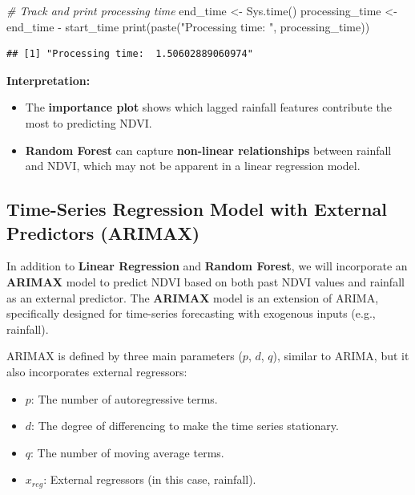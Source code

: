 \documentclass[
]{article}
\newenvironment{Shaded}{}{}
\newcommand{\CommentTok}[1]{\textcolor[rgb]{0.38,0.63,0.69}{\textit{#1}}}
\newcommand{\FunctionTok}[1]{\textcolor[rgb]{0.02,0.16,0.49}{#1}}
\newcommand{\NormalTok}[1]{#1}
\newcommand{\OtherTok}[1]{\textcolor[rgb]{0.00,0.44,0.13}{#1}}
\newcommand{\SpecialCharTok}[1]{\textcolor[rgb]{0.25,0.44,0.63}{#1}}
\newcommand{\StringTok}[1]{\textcolor[rgb]{0.25,0.44,0.63}{#1}}
\providecommand{\tightlist}{%
  \setlength{\itemsep}{0pt}\setlength{\parskip}{0pt}}
\begin{document}
\begin{Shaded}
\begin{Highlighting}[]
\CommentTok{\# Track and print processing time}
\NormalTok{end\_time }\OtherTok{\textless{}{-}} \FunctionTok{Sys.time}\NormalTok{()}
\NormalTok{processing\_time }\OtherTok{\textless{}{-}}\NormalTok{ end\_time }\SpecialCharTok{{-}}\NormalTok{ start\_time}
\FunctionTok{print}\NormalTok{(}\FunctionTok{paste}\NormalTok{(}\StringTok{"Processing time: "}\NormalTok{, processing\_time))}
\end{Highlighting}
\end{Shaded}

\begin{verbatim}
## [1] "Processing time:  1.50602889060974"
\end{verbatim}

\textbf{Interpretation:}

\begin{itemize}
\tightlist
\item
  The \textbf{importance plot} shows which lagged rainfall features
  contribute the most to predicting NDVI.
\item
  \textbf{Random Forest} can capture \textbf{non-linear relationships}
  between rainfall and NDVI, which may not be apparent in a linear
  regression model.
\end{itemize}

\subsection{Time-Series Regression Model with External Predictors
(ARIMAX)}\label{time-series-regression-model-with-external-predictors-arimax}

In addition to \textbf{Linear Regression} and \textbf{Random Forest}, we
will incorporate an \textbf{ARIMAX} model to predict NDVI based on both
past NDVI values and rainfall as an external predictor. The
\textbf{ARIMAX} model is an extension of ARIMA, specifically designed
for time-series forecasting with exogenous inputs (e.g., rainfall).

ARIMAX is defined by three main parameters (\(p\), \(d\), \(q\)),
similar to ARIMA, but it also incorporates external regressors:

\begin{itemize}
\tightlist
\item
  \(p\): The number of autoregressive terms.
\item
  \(d\): The degree of differencing to make the time series stationary.
\item
  \(q\): The number of moving average terms.
\item
  \(x_{reg}\): External regressors (in this case, rainfall).
\end{itemize}
\end{document}

